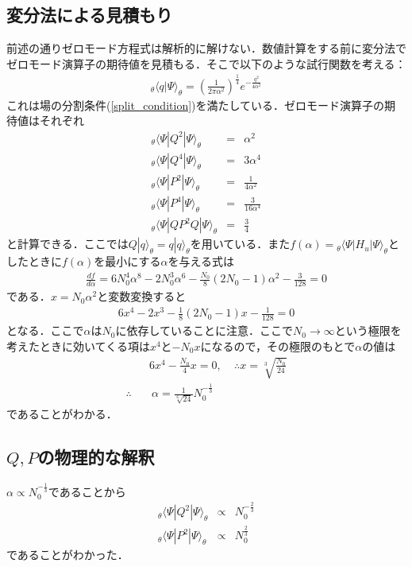 \documentclass[10.5pt,a4paper]{jreport}
\begin{document}
\subsection{変分法による見積もり}
前述の通りゼロモード方程式は解析的に解けない．数値計算をする前に変分法でゼロモード演算子の期待値を見積もる．そこで以下のような試行関数を考える：
\begin{eqnarray}
  _\theta\langle q|\Psi\rangle_\theta = \left(\frac{1}{2\pi\alpha^2}\right)^\frac{1}{4}e^{-\frac{q^2}{4\alpha^2}}
\end{eqnarray}
これは場の分割条件(\ref{split_condition})を満たしている．ゼロモード演算子の期待値はそれぞれ
\begin{eqnarray}
  _\theta\langle\Psi|Q^2|\Psi\rangle_\theta &=& \alpha^2\\
  _\theta\langle\Psi|Q^4|\Psi\rangle_\theta &=& 3\alpha^4\\
  _\theta\langle\Psi|P^2|\Psi\rangle_\theta &=& \frac{1}{4\alpha^2}\\
  _\theta\langle\Psi|P^4|\Psi\rangle_\theta &=& \frac{3}{16\alpha^4}\\
  _\theta\langle\Psi|QP^2Q|\Psi\rangle_\theta &=& \frac{3}{4}
\end{eqnarray}
と計算できる．ここでは$Q|q\rangle_\theta = q|q\rangle_\theta$を用いている．また$f(\alpha)=\!_\theta\langle\Psi|H_u|\Psi\rangle_\theta$としたときに$f(\alpha)$を最小にする$\alpha$を与える式は
\begin{eqnarray}
  \frac{df}{d\alpha} = 6N_0^4\alpha^8-2N_0^3\alpha^6-\frac{N_0}{8}(2N_0-1)\alpha^2-\frac{3}{128}=0
\end{eqnarray}
である．$x = N_0\alpha^2$と変数変換すると
\begin{eqnarray}
  6x^4-2x^3-\frac{1}{8}(2N_0-1)x-\frac{1}{128}=0
\end{eqnarray}
となる．ここで$\alpha$は$N_0$に依存していることに注意．ここで$N_0\rightarrow \infty$という極限を考えたときに効いてくる項は$x^4$と$-N_0x$になるので，その極限のもとで$\alpha$の値は
\begin{eqnarray}
  &&6x^4-\frac{N_0}{4}x=0,\ \ \ \ \ \therefore x = \sqrt[3]{\frac{N_0}{24}}\\
  \therefore &&\ \alpha = \frac{1}{\sqrt[6]{24}}N^{-\frac{1}{3}}_0
\end{eqnarray}
であることがわかる．
\subsection{$Q,P$の物理的な解釈}
$\alpha\propto N_0^{-\frac{1}{3}}$であることから
\begin{eqnarray}
  _\theta\langle\Psi|Q^2|\Psi\rangle_\theta &\propto& N_0^{-\frac{2}{3}}\label{Q_variation}\\
  _\theta\langle\Psi|P^2|\Psi\rangle_\theta &\propto& N_0^{\frac{2}{3}}
\end{eqnarray}
であることがわかった．
\end{document}
